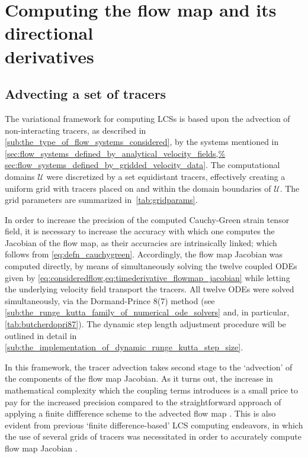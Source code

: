 \section[Computing the flow map and its directional derivatives]
{Computing the flow map and its directional\\ \phantom{3.2} derivatives}
\label{sec:computing_the_flow_map_and_its_directional_derivatives}

\subsection{Advecting a set of tracers}
\label{sub:advecting_a_set_of_tracers}

The variational framework for computing LCSs is based upon the advection of
non-interacting tracers, as described in
\cref{sub:the_type_of_flow_systems_considered}, by the systems mentioned in
\cref{sec:flow_systems_defined_by_analytical_velocity_fields,%
sec:flow_systems_defined_by_gridded_velocity_data}. The computational domains
$\mathcal{U}$ were discretized by a set equidistant tracers, effectively
creating a uniform grid with tracers placed on and within the domain boundaries
of $\mathcal{U}$. The grid parameters are summarized in~\cref{tab:gridparams}.



In order to increase the precision of the computed Cauchy-Green strain tensor
field, it is necessary to increase the accuracy with which one computes the
Jacobian of the flow map, as their accuracies are intrinsically linked;
which follows from \cref{eq:defn_cauchygreen}. Accordingly, the flow map
Jacobian was computed directly, by means of simultaneously solving the
twelve coupled ODEs given by
\cref{eq:consideredflow,eq:timederivative_flowmap_jacobian} while letting the
underlying velocity field transport the tracers. All twelve ODEs were solved
simultaneously, via the Dormand-Prince 8(7) method (see
\cref{sub:the_runge_kutta_family_of_numerical_ode_solvers} and, in particular,
\cref{tab:butcherdopri87}). The dynamic step length adjustment procedure
will be outlined in detail in
\cref{sub:the_implementation_of_dynamic_runge_kutta_step_size}.

In this framework, the tracer advection takes second stage to the `advection' of
the components of the flow map Jacobian. As it turns out, the increase in
mathematical complexity which the coupling terms introduces is a small price to
pay for the increased precision compared to the straightforward approach of
applying a finite diffference scheme to the advected flow map
\parencite{oettinger2016autonomous}. This is also evident from previous
`finite difference-based' LCS computing endeavors, in which the use of several
grids of tracers was necessitated in order to accurately compute flow map
Jacobian \parencite{loken2017sensitivity,farazmand2012computing}.


